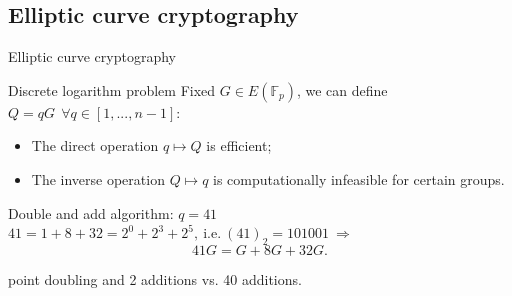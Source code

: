 \documentclass[slidescentered]{beamer}
\begin{document}
		\subsection{Elliptic curve cryptography}
		\begin{frame}{Elliptic curve cryptography}
			\begin{center}
		\end{center}
	\end{frame}

    
    \begin{frame}{Discrete logarithm problem}
    	Fixed $G \in E(\mathbb{F}_p)$, we can define $Q = qG \ \ \forall q \in [1, ..., n - 1]$:
    	\begin{itemize}
    		\item The direct operation $q \mapsto Q$ is efficient;
    		\item The inverse operation $Q \mapsto q$ is computationally infeasible for certain groups.
    	\end{itemize}

		\bigskip
	
	 	\begin{block}{Double and add algorithm: $q = 41$}
			$41 = 1 + 8 + 32 = 2^0 + 2^3 + 2^5, \ \text{i.e.} \ (41)_2 = 101001 \ \Longrightarrow$ 
			$$41G = G + 8G + 32G.$$
		
			 point doubling and 2 additions vs. 40 additions.
		\end{block}
	\end{frame}
    
\end{document}
